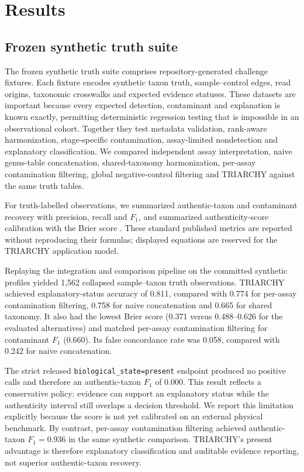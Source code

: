 \documentclass[9pt,twocolumn]{extarticle}
\newcommand{\software}[1]{\texttt{#1}}
\begin{document}
\section{Results}

\subsection{Frozen synthetic truth suite}

The frozen synthetic truth suite comprises repository-generated challenge
fixtures. Each fixture encodes synthetic taxon truth,
sample--control edges, read origins, taxonomic crosswalks and expected evidence
statuses. These datasets are important because every expected detection,
contaminant and explanation is known exactly, permitting deterministic
regression testing that is impossible in an observational cohort. Together
they test metadata validation, rank-aware harmonization, stage-specific
contamination, assay-limited nondetection and explanatory classification. We
compared independent assay interpretation, naive genus-table concatenation,
shared-taxonomy harmonization, per-assay contamination filtering, global
negative-control filtering and TRIARCHY against the same truth tables.

For truth-labelled observations, we summarized authentic-taxon and contaminant
recovery with precision, recall and $F_1$, and summarized authenticity-score
calibration with the Brier score \citep{brier1950}. These standard published
metrics are reported without reproducing their formulas; displayed equations
are reserved for the TRIARCHY application model.

Replaying the integration and comparison pipeline on the committed synthetic
profiles yielded 1,562 collapsed
sample--taxon truth observations. TRIARCHY achieved explanatory-status accuracy
of 0.811, compared with 0.774 for per-assay contamination filtering, 0.758 for
naive concatenation and 0.665 for shared taxonomy. It also had the lowest Brier
score (0.371 versus 0.488--0.626 for the evaluated alternatives) and matched
per-assay contamination filtering for contaminant $F_1$ (0.660). Its false
concordance rate was 0.058, compared with 0.242 for naive concatenation.

The strict released \software{biological\_state=present} endpoint produced no
positive calls and therefore an authentic-taxon $F_1$ of 0.000. This result
reflects a conservative policy: evidence can support an explanatory status
while the authenticity interval still overlaps a decision threshold. We
report this limitation explicitly because the score is not yet calibrated on
an external physical benchmark. By contrast, per-assay contamination filtering
achieved authentic-taxon $F_1=0.936$ in the same synthetic comparison.
TRIARCHY's present advantage is therefore explanatory classification and
auditable evidence reporting, not superior authentic-taxon recovery.
\end{document}
